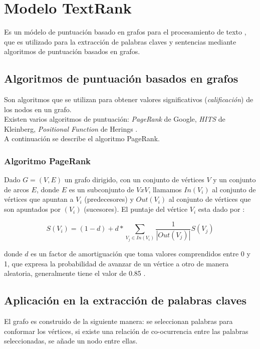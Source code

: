\section{Modelo TextRank}
Es un m\'odelo de puntuaci\'on basado en grafos para el procesamiento de
texto \cite{RMPT04}, que es utilizado para la extracci\'on de palabras claves
y sentencias mediante algoritmos de puntuaci\'on basados en grafos.

\subsection{Algoritmos de puntuaci\'on basados en grafos}
Son algoritmos que se utilizan para obtener valores significativos
(\emph{calificaci\'on}) de los nodos en un grafo. \\

Existen varios algoritmos de puntuaci\'on: \emph{PageRank} de Google,
\emph{HITS} de Kleinberg, \emph{Positional Function} de Herings \cite{RM04}. \\

A continuaci\'on se describe el algoritmo PageRank.

\subsubsection{Algoritmo PageRank}
Dado $G=(V,E)$ un grafo dirigido, con un conjunto de v\'ertices $V$ y un conjunto
de arcos $E$, donde $E$ es un subconjunto de $V x V$, llamamos $In(V_i)$ al
conjunto de v\'ertices que apuntan a $V_i$ (predecesores) y $Out(V_i)$ al 
conjunto de v\'ertices que son apuntados por $(V_i)$ (sucesores). El puntaje del
v\'ertice $V_i$ esta dado por \cite{SBLP98}:

\begin{equation}
	S(V_i) = (1 - d) + d * \sum_{V_j\in In(V_i)}{\frac{1}{|Out(V_j)|}S(V_j)}
\end{equation}

donde $d$ es un factor de amortiguaci\'on que toma valores comprendidos entre
0 y 1, que expresa la probabilidad de avanzar de un v\'ertice a otro de manera
aleatoria, generalmente tiene el valor de 0.85 \cite{SBLP98}.

\subsection{Aplicaci\'on en la extracci\'on de palabras claves}
El grafo es construido de la siguiente manera: se seleccionan palabras  para 
conformar los v\'ertices, si existe una relaci\'on de co-ocurrencia entre las palabras
seleccionadas, se a\~nade un nodo entre ellas. \\

